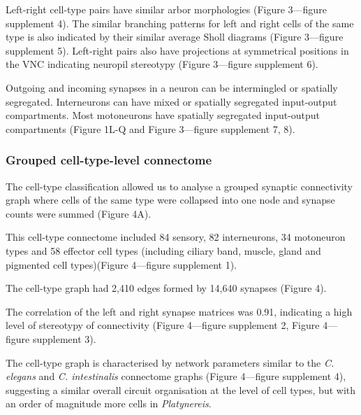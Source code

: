 \documentclass[
  11pt,
]{article}
\begin{document}
Left-right cell-type pairs have similar arbor morphologies (Figure
3---figure supplement 4). The similar branching patterns for left and
right cells of the same type is also indicated by their similar average
Sholl diagrams (Figure 3---figure supplement 5). Left-right pairs also
have projections at symmetrical positions in the VNC indicating neuropil
stereotypy (Figure 3---figure supplement 6).

Outgoing and incoming synapses in a neuron can be intermingled or
spatially segregated. Interneurons can have mixed or spatially
segregated input-output compartments. Most motoneurons have spatially
segregated input-output compartments (Figure 1L-Q and Figure 3---figure
supplement 7, 8).

\subsubsection{Grouped cell-type-level
connectome}\label{grouped-cell-type-level-connectome}

The cell-type classification allowed us to analyse a grouped synaptic
connectivity graph where cells of the same type were collapsed into one
node and synapse counts were summed (Figure 4A).

This cell-type connectome included 84 sensory, 82 interneurons, 34
motoneuron types and 58 effector cell types (including ciliary band,
muscle, gland and pigmented cell types)(Figure 4---figure supplement 1).

The cell-type graph had 2,410 edges formed by 14,640 synapses (Figure
4).

The correlation of the left and right synapse matrices was 0.91,
indicating a high level of stereotypy of connectivity (Figure 4---figure
supplement 2, Figure 4---figure supplement 3).

The cell-type graph is characterised by network parameters similar to
the \emph{C. elegans} and \emph{C. intestinalis} connectome graphs
(Figure 4---figure supplement 4), suggesting a similar overall circuit
organisation at the level of cell types, but with an order of magnitude
more cells in \emph{Platynereis}.
\end{document}
